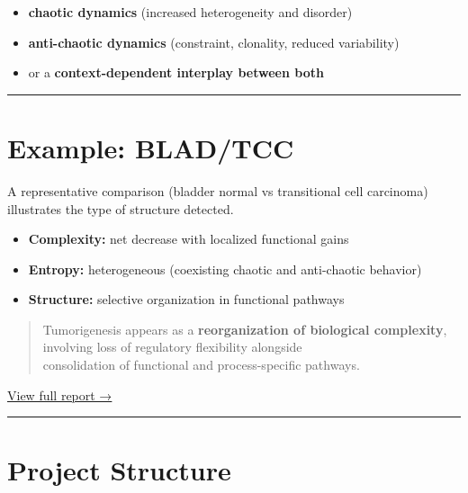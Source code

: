 \documentclass[
  letterpaper,
  DIV=11,
  numbers=noendperiod,
  openany,
  oneside]{scrreprt}
\providecommand{\tightlist}{%
  \setlength{\itemsep}{0pt}\setlength{\parskip}{0pt}}
\begin{document}
\begin{itemize}
\tightlist
\item
  \textbf{chaotic dynamics} (increased heterogeneity and disorder)\\
\item
  \textbf{anti-chaotic dynamics} (constraint, clonality, reduced
  variability)\\
\item
  or a \textbf{context-dependent interplay between both}
\end{itemize}

\begin{center}\rule{0.5\linewidth}{0.5pt}\end{center}

\section{Example: BLAD/TCC}\label{example-bladtcc}

A representative comparison (bladder normal vs transitional cell
carcinoma) illustrates the type of structure detected.

\begin{itemize}
\tightlist
\item
  \textbf{Complexity:} net decrease with localized functional gains\\
\item
  \textbf{Entropy:} heterogeneous (coexisting chaotic and anti-chaotic
  behavior)\\
\item
  \textbf{Structure:} selective organization in functional pathways
\end{itemize}

\begin{quote}
Tumorigenesis appears as a \textbf{reorganization of biological
complexity},\\
involving loss of regulatory flexibility alongside\\
consolidation of functional and process-specific pathways.
\end{quote}

\href{reports/generated_reports/comparison_report_blad_tcc.html}{View
full report →}

\begin{center}\rule{0.5\linewidth}{0.5pt}\end{center}

\section{Project Structure}\label{project-structure}
\end{document}
